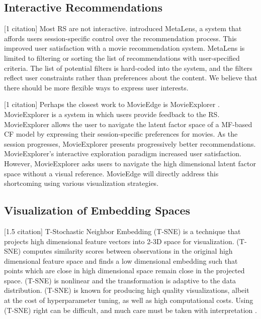 \subsection{Interactive Recommendations}

[1 citation] Most RS are not interactive. \cite{schafer2002meta} introduced MetaLens, a system that affords users session-specific control over the recommendation process. This improved user satisfaction with a movie recommendation system. MetaLens is limited to filtering or sorting the list of recommendations with user-specified criteria. The list of potential filters is hard-coded into the system, and the filters reflect user constraints rather than preferences about the content. We believe that there should be more flexible ways to express user interests.

[1 citation] Perhaps the closest work to MovieEdge is MovieExplorer \cite{taijala2018movieexplorer}. MovieExplorer is a system in which users provide feedback to the RS. MovieExplorer allows the user to navigate the latent factor space of a MF-based CF model by expressing their session-specific preferences for movies.  As the session progresses, MovieExplorer presents progressively better recommendations. MovieExplorer’s interactive exploration paradigm increased user satisfaction. However, MovieExplorer asks users to navigate the high dimensional latent factor space without a visual reference. MovieEdge will directly address this shortcoming using various visualization strategies.

\subsection{Visualization of Embedding Spaces}

[1.5 citation] T-Stochastic Neighbor Embedding \mbox{(T-SNE)} \cite{maaten2008visualizing} is a technique that projects high dimensional feature vectors into 2-3D space for visualization. \mbox{(T-SNE)} computes similarity scores between observations in the original high dimensional feature space and finds a low dimensional embedding such that points which are close in high dimensional space remain close in the projected space. \mbox{(T-SNE)} is nonlinear and the transformation is adaptive to the data distribution. \mbox{(T-SNE)} is known for producing high quality visualizations, albeit at the cost of hyperparameter tuning, as well as high computational costs. Using \mbox{(T-SNE)} right can be difficult, and much care must be taken with interpretation \cite{wattenberg2016how}.

